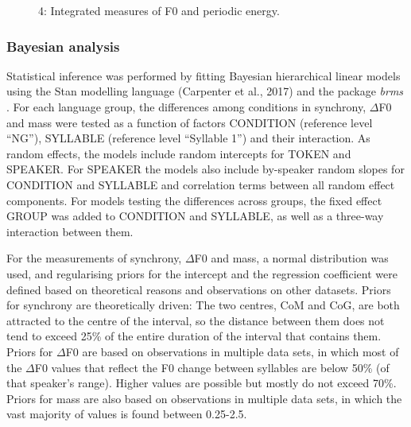   
 

\begin{stylecaption}\begin{figure}
\caption{4: Integrated measures of F0 and periodic energy.} 
\label{fig:key:2}
\end{figure}\end{stylecaption}

\subsubsection{Bayesian analysis}
\hypertarget{Toc191305895}{}
Statistical inference was performed by fitting Bayesian hierarchical linear models using the Stan modelling language (Carpenter et al., 2017) and the package \textit{brms} \citep{Bürkner2016}. For each language group, the differences among conditions in synchrony, ${\Delta}$F0 and mass were tested as a function of factors CONDITION (reference level “NG”), SYLLABLE (reference level “Syllable 1”) and their interaction. As random effects, the models include random intercepts for TOKEN and SPEAKER. For SPEAKER the models also include by-speaker random slopes for CONDITION and SYLLABLE and correlation terms between all random effect components. For models testing the differences across groups, the fixed effect GROUP was added to CONDITION and SYLLABLE, as well as a three-way interaction between them.

For the measurements of synchrony, ${\Delta}$F0 and mass, a normal distribution was used, and regularising priors for the intercept and the regression coefficient were defined based on theoretical reasons and observations on other datasets. Priors for synchrony are theoretically driven: The two centres, CoM and CoG, are both attracted to the centre of the interval, so the distance between them does not tend to exceed 25\% of the entire duration of the interval that contains them. Priors for ${\Delta}$F0 are based on observations in multiple data sets, in which most of the ${\Delta}$F0 values that reflect the F0 change between syllables are below 50\% (of that speaker’s range). Higher values are possible but mostly do not exceed 70\%. Priors for mass are also based on observations in multiple data sets, in which the vast majority of values is found between 0.25-2.5.

